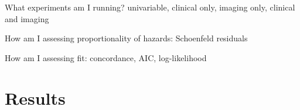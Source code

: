 What experiments am I running? univariable, clinical only, imaging only, clinical and imaging

How am I assessing proportionality of hazards: Schoenfeld residuals

How am I assessing fit: concordance, AIC, log-likelihood

\section{Results}




